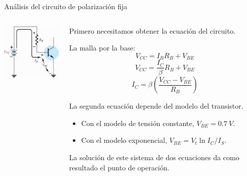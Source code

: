 \documentclass[t,aspectratio=169]{beamer}
\begin{document}
\begin{frame}{Análisis del circuito de polarización fija}

\begin{columns}
\begin{column}{0.25\textwidth}

\includegraphics[width=\textwidth]{figures/polarizacion_fija_analisis.png}

\end{column}
\begin{column}{0.75\textwidth}

Primero necesitamos obtener la ecuación del circuito.

La malla por la base:
%
\[ V_{CC} = I_B R_B + V_{BE} \]
%
\[ V_{CC} = \dfrac{I_C}{\beta} R_B + V_{BE} \]
%
\[ I_C = \beta \left( \dfrac{V_{CC} - V_{BE}}{R_B} \right) \]

La segunda ecuación depende del modelo del transistor.

\begin{itemize}
    \item Con el modelo de tensión constante, $V_{BE} = 0.7\ V$.
    \item Con el modelo exponencial, $V_{BE} = V_t \ln I_C/I_S$.
\end{itemize}

La solución de este sistema de dos ecuaciones da como resultado el punto de operación.

\end{column}
\end{columns}
    
\end{frame}
\end{document}
